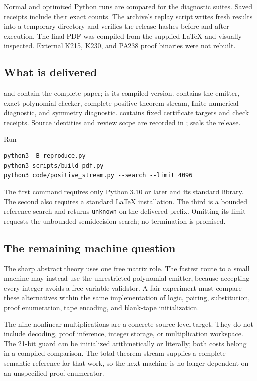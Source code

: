 Normal and optimized Python runs are compared for the diagnostic suites. Saved receipts include their exact counts. The archive's replay script writes fresh results into a temporary directory and verifies the release hashes before and after execution. The final PDF was compiled from the supplied LaTeX and visually inspected. External K215, K230, and PA238 proof binaries were not rebuilt.

\subsection{What is delivered}

 and  contain the complete paper;  is its compiled version.  contains the emitter, exact polynomial checker, complete positive theorem stream, finite numerical diagnostic, and symmetry diagnostic.  contains fixed certificate targets and check receipts. Source identities and review scope are recorded in ;  seals the release.

Run
\begin{lstlisting}
python3 -B reproduce.py
python3 scripts/build_pdf.py
python3 code/positive_stream.py --search --limit 4096
\end{lstlisting}
The first command requires only Python 3.10 or later and its standard library. The second also requires a standard LaTeX installation. The third is a bounded reference search and returns \texttt{unknown} on the delivered prefix. Omitting its limit requests the unbounded semidecision search; no termination is promised.

\subsection{The remaining machine question}

The sharp abstract theory uses one free matrix role. The fastest route to a small machine may instead use the unrestricted polynomial emitter, because accepting every integer avoids a free-variable validator. A fair experiment must compare these alternatives within the same implementation of logic, pairing, substitution, proof enumeration, tape encoding, and blank-tape initialization.

The nine nonlinear multiplications are a concrete source-level target. They do not include decoding, proof inference, integer storage, or multiplication workspace. The 21-bit guard can be initialized arithmetically or literally; both costs belong in a compiled comparison. The total theorem stream supplies a complete semantic reference for that work, so the next machine is no longer dependent on an unspecified proof enumerator.

